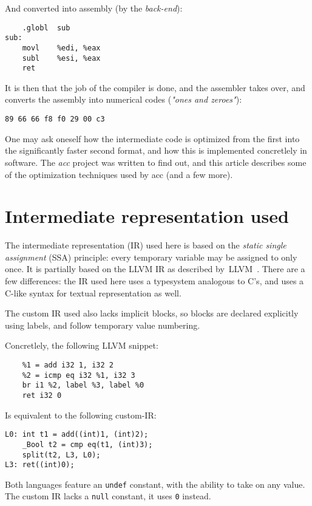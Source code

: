 \documentclass[12pt, a4paper]{article}
\begin{document}
And converted into assembly (by the \textit{back-end}):

\begin{lstlisting}
	.globl	sub
sub:
	movl	%edi, %eax
	subl	%esi, %eax
	ret
\end{lstlisting}

It is then that the job of the compiler is done, and the assembler takes over,
and converts the assembly into numerical codes (\textit{"ones and zeroes"}):

\begin{lstlisting}
89 66 66 f8 f0 29 00 c3
\end{lstlisting}

One may ask oneself how the intermediate code is optimized from the first into
the significantly faster second format, and how this is implemented concretlely
in software. The \textit{acc} project was written to find out, and this article
describes some of the optimization techniques used by acc (and a few more).

  \section{Intermediate representation used}
  \label{sec:irused}
The intermediate representation (IR) used here is based on the \textit{static
single assignment} (SSA) principle: every temporary variable may be assigned to
only once. It is partially based on the LLVM IR as described by~LLVM~\cite{llvm_ir}.
There are a few differences: the IR used here  uses a typesystem analogous to
C's, and uses a C-like syntax for textual 
representation as well.

The custom IR used also lacks implicit blocks, so blocks are declared 
explicitly using labels, and follow temporary value numbering.

Concretlely, the following LLVM snippet:

\begin{lstlisting}
	%1 = add i32 1, i32 2
	%2 = icmp eq i32 %1, i32 3
	br i1 %2, label %3, label %0
	ret i32 0
\end{lstlisting}

Is equivalent to the following custom-IR:

\begin{lstlisting}
L0:	int t1 = add((int)1, (int)2);
	_Bool t2 = cmp eq(t1, (int)3);
	split(t2, L3, L0);
L3:	ret((int)0);
\end{lstlisting}

Both languages feature an \verb+undef+ constant, with the ability to take on any
value. The custom IR lacks a \verb+null+ constant, it uses \verb+0+ instead.
\end{document}
